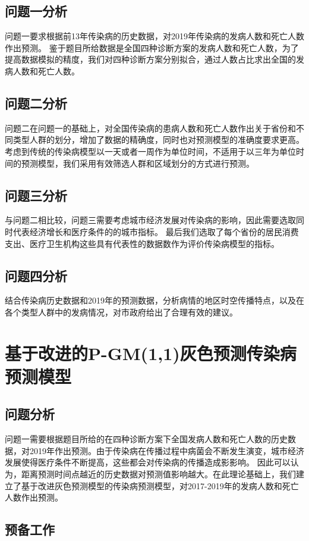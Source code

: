 \documentclass{whutmod}
\begin{document}
\subsection{问题一分析}
问题一要求根据前13年传染病的历史数据，对2019年传染病的发病人数和死亡人数作出预测。
鉴于题目所给数据是全国四种诊断方案的发病人数和死亡人数，为了提高数据模拟的精度，我们对四种诊断方案分别拟合，通过人数占比求出全国的发病人数和死亡人数。

\subsection{问题二分析}
问题二在问题一的基础上，对全国传染病的患病人数和死亡人数作出关于省份和不同类型人群的划分，增加了数据的精确度，同时也对预测模型的准确度要求更高。
考虑到传统的传染病模型以一天或者一周作为单位时间，不适用于以三年为单位时间的预测模型，我们采用有效筛选人群和区域划分的方式进行预测。

\subsection{问题三分析}
与问题二相比较，问题三需要考虑城市经济发展对传染病的影响，因此需要选取同时代表经济增长和医疗条件的的城市指标。
最后我们选取了每个省份的居民消费支出、医疗卫生机构这些具有代表性的数据数作为评价传染病模型的指标。

\subsection{问题四分析}
结合传染病历史数据和2019年的预测数据，分析病情的地区时空传播特点，以及在各个类型人群中的发病情况，对市政府给出了合理有效的建议。

\section{基于改进的P-GM(1,1)灰色预测传染病预测模型}
\subsection{问题分析}
问题一需要根据题目所给的在四种诊断方案下全国发病人数和死亡人数的历史数据，对2019年作出预测。由于传染病在传播过程中病菌会不断发生演变，城市经济发展使得医疗条件不断提高，这些都会对传染病的传播造成影影响。
因此可以认为，距离预测时间点越近的历史数据对预测值影响越大。在此理论基础上，我们建立了基于改进灰色预测模型的传染病预测模型，对2017-2019年的发病人数和死亡人数作出预测。

\subsection{预备工作}
\end{document}
